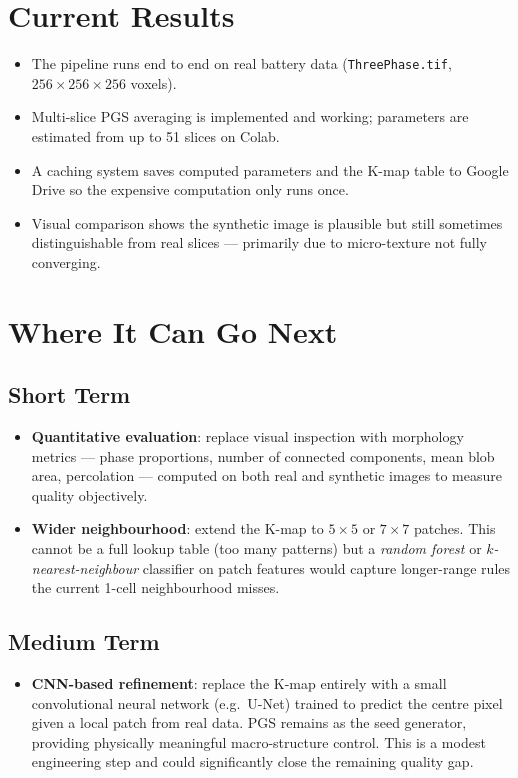 \documentclass[11pt, a4paper]{article}
\begin{document}
\section{Current Results}

\begin{itemize}
    \item The pipeline runs end to end on real battery data (\texttt{ThreePhase.tif}, $256 \times 256 \times 256$ voxels).
    \item Multi-slice PGS averaging is implemented and working; parameters are estimated from up to 51 slices on Colab.
    \item A caching system saves computed parameters and the K-map table to Google Drive so the expensive computation only runs once.
    \item Visual comparison shows the synthetic image is plausible but still sometimes distinguishable from real slices --- primarily due to micro-texture not fully converging.
\end{itemize}

\section{Where It Can Go Next}

\subsection{Short Term}

\begin{itemize}
    \item \textbf{Quantitative evaluation}: replace visual inspection with morphology metrics --- phase proportions, number of connected components, mean blob area, percolation --- computed on both real and synthetic images to measure quality objectively.
    \item \textbf{Wider neighbourhood}: extend the K-map to $5 \times 5$ or $7 \times 7$ patches. This cannot be a full lookup table (too many patterns) but a \emph{random forest} or \emph{$k$-nearest-neighbour} classifier on patch features would capture longer-range rules the current 1-cell neighbourhood misses.
\end{itemize}

\subsection{Medium Term}

\begin{itemize}
    \item \textbf{CNN-based refinement}: replace the K-map entirely with a small convolutional neural network (e.g.\ U-Net) trained to predict the centre pixel given a local patch from real data. PGS remains as the seed generator, providing physically meaningful macro-structure control. This is a modest engineering step and could significantly close the remaining quality gap.
\end{itemize}
\end{document}

